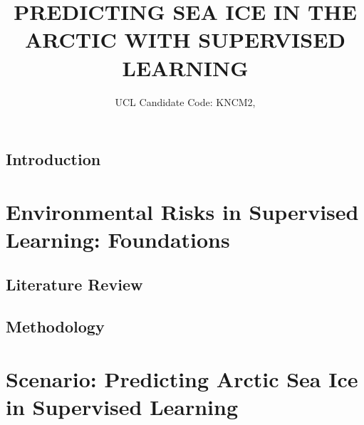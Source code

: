 \documentclass[12pt]{report}
\begin{document}
\title{PREDICTING SEA ICE IN THE ARCTIC WITH SUPERVISED LEARNING}
\author{UCL Candidate Code: KNCM2, }



\beforepreface
\hypersetup{linkcolor=magenta}

\hypersetup{linkcolor=.}

\afterpreface
\hypersetup{linkcolor=magenta}



\chapter{Introduction}                          %
\label{Chapter1:Intro}




\part{Environmental Risks in Supervised Learning: Foundations}

\chapter{Literature Review}                     %
\label{Chapter2:Review}



\chapter{Methodology}                           %
\label{Chapter3:Method}








\part{Scenario: Predicting Arctic Sea Ice in Supervised Learning}
\end{document}
